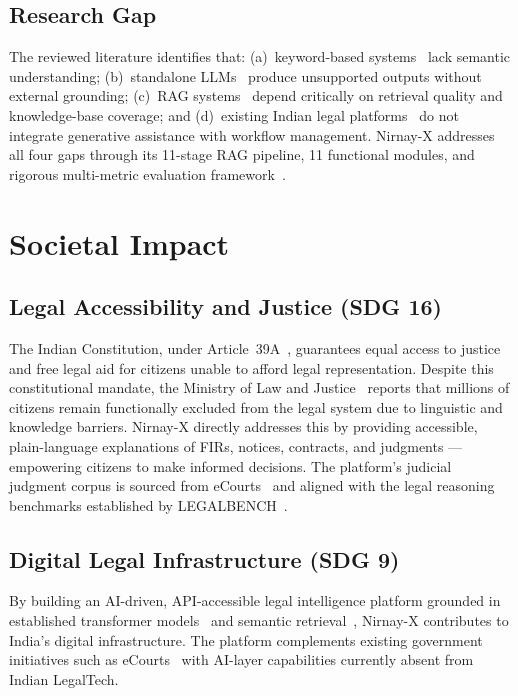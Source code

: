 \documentclass[12pt,a4paper]{article}
\begin{document}
\subsection{Research Gap}

The reviewed literature identifies that: (a)~keyword-based systems~\cite{manning2008ir}
lack semantic understanding; (b)~standalone LLMs~\cite{vaswani2017attention,
devlin2019bert} produce unsupported outputs without external grounding; (c)~RAG
systems~\cite{lewis2020rag} depend critically on retrieval quality and knowledge-base
coverage; and (d)~existing Indian legal platforms~\cite{ecourts, indiankanoon} do not
integrate generative assistance with workflow management. Nirnay-X addresses all four
gaps through its 11-stage RAG pipeline, 11 functional modules, and rigorous
multi-metric evaluation framework~\cite{manning2008ir, guha2023legalbench}.

\section{Societal Impact}

\subsection{Legal Accessibility and Justice (SDG 16)}

The Indian Constitution, under Article~39A~\cite{const_india}, guarantees equal access
to justice and free legal aid for citizens unable to afford legal representation.
Despite this constitutional mandate, the Ministry of Law and Justice~\cite{mlaw}
reports that millions of citizens remain functionally excluded from the legal system
due to linguistic and knowledge barriers. Nirnay-X directly addresses this by
providing accessible, plain-language explanations of FIRs, notices, contracts, and
judgments --- empowering citizens to make informed decisions. The platform's judicial
judgment corpus is sourced from eCourts~\cite{ecourts} and aligned with the legal
reasoning benchmarks established by LEGALBENCH~\cite{guha2023legalbench}.

\subsection{Digital Legal Infrastructure (SDG 9)}

By building an AI-driven, API-accessible legal intelligence platform grounded in
established transformer models~\cite{vaswani2017attention, devlin2019bert} and
semantic retrieval~\cite{reimers2019sbert, manning2008ir}, Nirnay-X contributes to
India's digital infrastructure. The platform complements existing government
initiatives such as eCourts~\cite{ecourts} with AI-layer capabilities currently
absent from Indian LegalTech.
\end{document}
